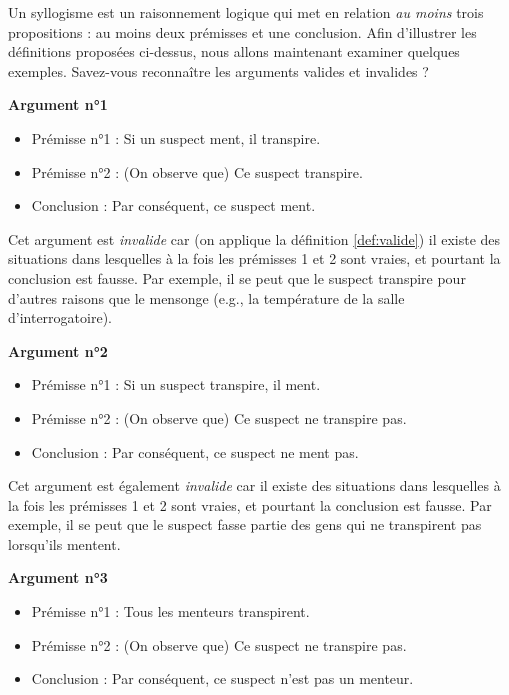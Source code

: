 \documentclass[
  a4paper,11pt,twoside,onecolumn,openright,final,oldfontcommands]{memoir}
\providecommand{\tightlist}{%
  \setlength{\itemsep}{0pt}\setlength{\parskip}{0pt}}
\theoremstyle{definition}
\theoremstyle{definition}
\theoremstyle{definition}
\theoremstyle{definition}
\theoremstyle{remark}
\begin{document}
Un syllogisme est un raisonnement logique qui met en relation \emph{au moins} trois propositions : au moins deux prémisses et une conclusion. Afin d'illustrer les définitions proposées ci-dessus, nous allons maintenant examiner quelques exemples. Savez-vous reconnaître les arguments valides et invalides ?

\textbf{Argument n°1}

\begin{itemize}
\tightlist
\item
  Prémisse n°1 : Si un suspect ment, il transpire.
\item
  Prémisse n°2 : (On observe que) Ce suspect transpire.
\item
  Conclusion : Par conséquent, ce suspect ment.
\end{itemize}

Cet argument est \emph{invalide} car (on applique la définition \ref{def:valide}) il existe des situations dans lesquelles à la fois les prémisses 1 et 2 sont vraies, et pourtant la conclusion est fausse. Par exemple, il se peut que le suspect transpire pour d'autres raisons que le mensonge (e.g., la température de la salle d'interrogatoire).

\textbf{Argument n°2}

\begin{itemize}
\tightlist
\item
  Prémisse n°1 : Si un suspect transpire, il ment.
\item
  Prémisse n°2 : (On observe que) Ce suspect ne transpire pas.
\item
  Conclusion : Par conséquent, ce suspect ne ment pas.
\end{itemize}

Cet argument est également \emph{invalide} car il existe des situations dans lesquelles à la fois les prémisses 1 et 2 sont vraies, et pourtant la conclusion est fausse. Par exemple, il se peut que le suspect fasse partie des gens qui ne transpirent pas lorsqu'ils mentent.

\textbf{Argument n°3}

\begin{itemize}
\tightlist
\item
  Prémisse n°1 : Tous les menteurs transpirent.
\item
  Prémisse n°2 : (On observe que) Ce suspect ne transpire pas.
\item
  Conclusion : Par conséquent, ce suspect n'est pas un menteur.
\end{itemize}
\end{document}
